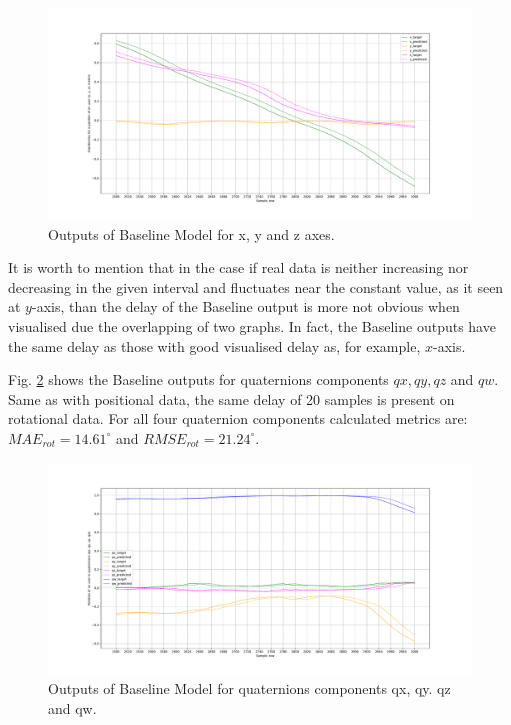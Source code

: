 \begin{figure}[htb]
	\begin{center}
		\includegraphics[width=1\textwidth, keepaspectratio]{gfx/base_zoom-xyz_position.pdf}
		\caption{\label{fig:base_xyz} Outputs of Baseline Model for x, y and z axes.}
	\end{center}
\end{figure}

It is worth to mention that in the case if real data is neither increasing nor decreasing in the given interval and fluctuates near the constant value, as it seen at $y$-axis, than the delay of the Baseline output is more not obvious when visualised due the overlapping of two graphs. In fact, the Baseline outputs have the same delay as those with good visualised delay as, for example, $x$-axis.

Fig. \ref{fig:base_quat_xyzw} shows the Baseline outputs for quaternions components $qx, qy, qz$ and $qw$. Same as with positional data, the same delay of 20 samples is present on rotational data. For all four quaternion components calculated metrics  are: $MAE_{rot} = 14.61^{\circ}$ and $RMSE_{rot} =21.24^{\circ}$.  

\begin{figure}[htb]
	\begin{center}
		\includegraphics[width=1\textwidth, keepaspectratio]{gfx/base_zoom-qx_qy_qz_qw_rotation.pdf}
		\caption{\label{fig:base_quat_xyzw} Outputs of Baseline Model for quaternions components qx, qy. qz and qw.}
	\end{center}
\end{figure}

